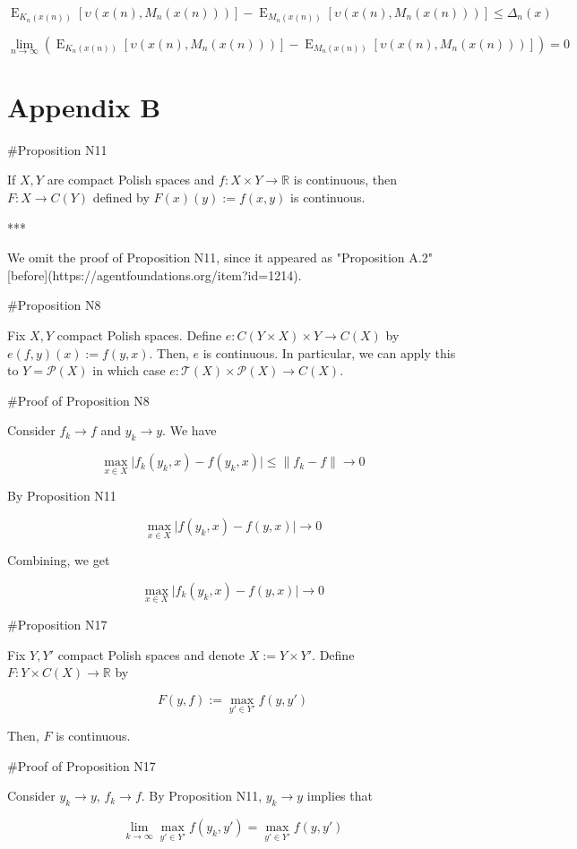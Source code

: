 \documentclass[a4paper]{article}
\DeclareMathOperator{\E}{E}
\newcommand{\Reals}{\mathbb{R}}
\newcommand{\Abs}[1]{\lvert #1 \rvert}
\newcommand{\Norm}[1]{\lVert #1 \rVert}
\newcommand{\Prob}{\mathcal{P}}
\newcommand{\T}{\mathcal{T}}
\begin{document}
$$\E_{K_n(x(n))}[\upsilon(x(n),M_n(x(n)))]-\E_{M_n(x(n))}[\upsilon(x(n),M_n(x(n)))] \leq \Delta_n(x)$$

$$\lim_{n \rightarrow \infty} (\E_{K_n(x(n))}[\upsilon(x(n),M_n(x(n)))]-\E_{M_n(x(n))}[\upsilon(x(n),M_n(x(n)))]) = 0$$

\section{Appendix B}

\#Proposition N11

If ${X,Y}$ are compact Polish spaces and ${f: X \times Y \rightarrow \Reals}$ is continuous, then ${F: X \rightarrow C(Y)}$ defined by ${F(x)(y):=f(x,y)}$ is continuous.

***

We omit the proof of Proposition N11, since it appeared as "Proposition A.2" [before](https://agentfoundations.org/item?id=1214).

\#Proposition N8

Fix ${X,Y}$ compact Polish spaces. Define ${e: C(Y \times X) \times Y \rightarrow C(X)}$ by ${e(f,y)(x):=f(y,x)}$. Then, ${e}$ is continuous. In particular, we can apply this to ${Y = \Prob(X)}$ in which case ${e: \T(X) \times \Prob(X) \rightarrow C(X)}$.

\#Proof of Proposition N8

Consider ${f_k \rightarrow f}$ and ${y_k \rightarrow y}$. We have

$$\max_{x \in X} \Abs{f_k(y_k,x)-f(y_k,x)} \leq \Norm{f_k - f} \rightarrow 0$$

By Proposition N11

$$\max_{x \in X} \Abs{f(y_k,x)-f(y,x)} \rightarrow 0$$

Combining, we get

$$\max_{x \in X} \Abs{f_k(y_k,x)-f(y,x)} \rightarrow 0$$

\#Proposition N17

Fix ${Y,Y'}$ compact Polish spaces and denote ${X:=Y \times Y'}$. Define ${F: Y \times C(X) \rightarrow \Reals}$ by 

$${F(y,f):=\max_{y' \in Y'} f(y,y')}$$

Then, ${F}$ is continuous.

\#Proof of Proposition N17

Consider ${y_k \rightarrow y}$, ${f_k \rightarrow f}$. By Proposition N11, ${y_k \rightarrow y}$ implies that

$${\lim_{k \rightarrow \infty} \max_{y' \in Y'} f(y_k,y') = \max_{y' \in Y'} f(y,y')}$$
\end{document}
